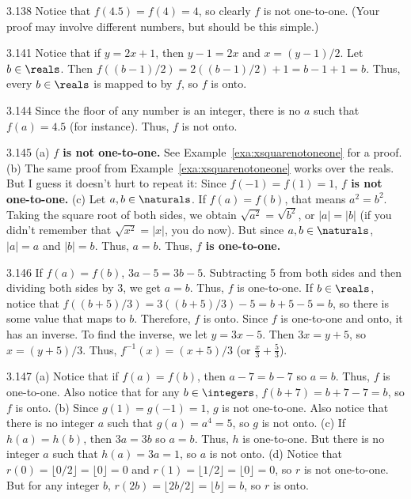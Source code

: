 \begin{Answer}{3.138}
Notice that $f(4.5)=f(4)=4$, so clearly $f$ is not one-to-one.
(Your proof may involve different numbers, but should be this simple.)
\end{Answer}
\begin{Answer}{3.141}
Notice that if $y=2x+1$, then $y-1=2x$ and $x=(y-1)/2$.
Let $b\in\reals$.  Then $f((b-1)/2)=2((b-1)/2)+1 = b-1+1=b$.
Thus, every $b\in\reals$ is mapped to by $f$, so $f$ is onto.
\end{Answer}
\begin{Answer}{3.144}
Since the floor of any number is an integer, there is no $a$ such that $f(a)=4.5$ (for instance).
Thus, $f$ is not onto.
\end{Answer}
\begin{Answer}{3.145}
(a) {\bf $f$ is not one-to-one.}  See Example~\ref{exa:xsquarenotoneone} for a proof.
(b) The same proof from Example~\ref{exa:xsquarenotoneone} works over the reals.
But I guess it doesn't hurt to repeat it:  Since $f(-1)=f(1)=1$, {\bf $f$ is not one-to-one.}
(c) Let $a,b\in\naturals$.  If $f(a)=f(b)$,
that means $a^2=b^2$. Taking the square root of both sides, we obtain $\sqrt{a^2}=\sqrt{b^2}$, or
$|a|=|b|$  (if you didn't remember that
$\sqrt{x^2}=|x|$, you do now).
But since $a,b\in\naturals$, $|a|=a$ and $|b|=b$.  Thus, $a=b$.  Thus, {\bf $f$ is one-to-one.}
\end{Answer}
\begin{Answer}{3.146}
If $f(a)=f(b)$, $3a-5=3b-5$.  Subtracting 5 from both sides and then dividing both sides by $3$,
we get $a=b$.  Thus, $f$ is one-to-one.
If $b\in\reals$, notice that $f((b+5)/3)=3((b+5)/3)-5 = b+5-5=b$, so there is some value that maps
to $b$.  Therefore, $f$ is onto.  Since $f$ is one-to-one and onto, it has an inverse.
To find the inverse, we
let $y=3x-5$.  Then $3x=y+5$, so $x=(y+5)/3$.  Thus, $f^{-1}(x)=(x+5)/3$
(or $\frac{x}{3}+\frac{5}{3}$).
\end{Answer}
\begin{Answer}{3.147}
(a)
Notice that if $f(a)=f(b)$, then $a-7=b-7$ so $a=b$.  Thus, $f$ is one-to-one.
Also notice that for any $b\in\integers$, $f(b+7)=b+7-7=b$, so $f$ is onto.
(b) Since $g(1)=g(-1)=1$, $g$ is not one-to-one.  Also notice that there is no integer $a$ such that
$g(a)=a^4=5$, so $g$ is not onto.
(c) If $h(a)=h(b)$, then $3a=3b$ so $a=b$.  Thus, $h$ is one-to-one.
But there is no integer $a$ such that $h(a)=3a=1$, so $a$ is not onto.
(d) Notice that $r(0)=\lfloor 0/2\rfloor=\lfloor 0\rfloor = 0$ and
$r(1)=\lfloor 1/2\rfloor=\lfloor 0\rfloor = 0$, so $r$ is not one-to-one.
But for any integer $b$, $r(2b)=\lfloor 2b/2\rfloor=\lfloor b\rfloor = b$, so $r$ is onto.
\end{Answer}
